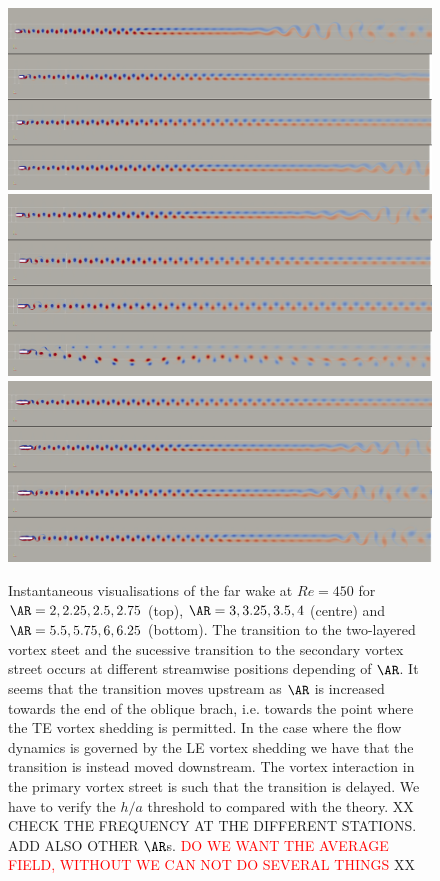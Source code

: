 \begin{figure}
  \includegraphics[width=\textwidth]{./fig/appendix/AR_2_2p75_Re450.png}
  \includegraphics[width=\textwidth]{./fig/appendix/AR_3_4_Re450.png}
  \includegraphics[width=\textwidth]{./fig/appendix/AR_5p5_6p25_Re450.png}    
  \caption{Instantaneous visualisations of the far wake at $Re=450$ for $\AR=2,2.25,2.5,2.75$ (top), $\AR= 3, 3.25, 3.5, 4$ (centre) and $\AR=5.5,5.75,6,6.25$ (bottom). The transition to the two-layered vortex steet and the sucessive transition to the secondary vortex street occurs at different streamwise positions depending of $\AR$. It seems that the transition moves upstream as $\AR$ is increased towards the end of the oblique brach, i.e. towards the point where the TE vortex shedding is permitted. In the case where the flow dynamics is governed by the LE vortex shedding we have that the transition is instead moved downstream. The vortex interaction in the primary vortex street is such that the transition is delayed. We have to verify the $h/a$ threshold to compared with the theory. XX CHECK THE FREQUENCY AT THE DIFFERENT STATIONS. ADD ALSO OTHER $\AR$s. \textcolor{red}{DO WE WANT THE AVERAGE FIELD, WITHOUT WE CAN NOT DO SEVERAL THINGS} XX}

\end{figure}

